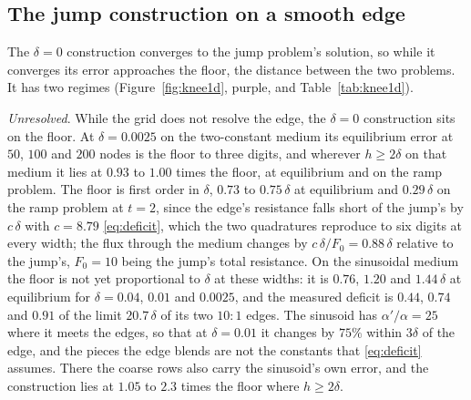 \documentclass[11pt]{amsart}
\theoremstyle{definition}
\theoremstyle{remark}
\newcommand{\para}[1]{\par\smallskip\noindent\textit{#1}.\enspace}
\begin{document}
\subsection{The jump construction on a smooth edge}
\label{sec:construction1d}
The $\delta = 0$ construction converges to the jump problem's solution, so
while it converges its error approaches the floor, the distance between the
two problems. It has two
regimes (Figure~\ref{fig:knee1d}, purple, and Table~\ref{tab:knee1d}).

\para{Unresolved}
While the grid does not resolve the edge, the $\delta = 0$ construction sits on the
floor. At $\delta = 0.0025$ on the two-constant medium its equilibrium error
at $50$, $100$ and $200$ nodes is the floor to three digits, and wherever
$h \ge 2\delta$ on that medium it lies at $0.93$ to $1.00$ times the floor,
at equilibrium and on the ramp problem. The floor is first order in
$\delta$, $0.73$ to $0.75\,\delta$ at equilibrium and $0.29\,\delta$ on the
ramp problem at $t = 2$, since the edge's resistance falls short of the
jump's by $c\,\delta$ with $c = 8.79$ \eqref{eq:deficit}, which the two
quadratures reproduce to six digits at every width; the flux through the
medium changes by $c\,\delta / F_0 = 0.88\,\delta$ relative to the jump's,
$F_0 = 10$ being the jump's total resistance. On the sinusoidal medium the
floor is not yet proportional to $\delta$ at these widths: it is $0.76$,
$1.20$ and $1.44\,\delta$ at equilibrium for $\delta = 0.04$, $0.01$ and
$0.0025$, and the measured deficit is $0.44$, $0.74$ and $0.91$ of the
limit $20.7\,\delta$ of its two $10 : 1$ edges. The sinusoid has
$\alpha' / \alpha = 25$ where it meets the edges, so that at
$\delta = 0.01$ it changes by $75\%$ within $3\delta$ of the edge, and the
pieces the edge blends are not the constants that \eqref{eq:deficit}
assumes. There the coarse rows also carry the sinusoid's own error, and the
construction lies at $1.05$ to $2.3$ times the floor where $h \ge 2\delta$.
\end{document}
